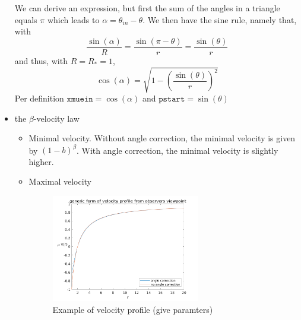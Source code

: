 \documentclass[../main/main.tex]{subfiles}
\begin{document}
\begin{itemize}
\begin{center}
\end{center}
We can derive an expression, but first the sum of the angles in a triangle equals $\pi$ which leads to $\alpha = \theta_{in} - \theta$. We then have the sine rule, namely that, with
\begin{equation}
\frac{\sin(\alpha)}{R} = \frac{\sin(\pi-\theta)}{r} = \frac{\sin(\theta)}{r}
\end{equation}
and thus, with $R=R_{*} = 1$,
\begin{equation}
\cos(\alpha) = \sqrt{1 - \left( \frac{\sin(\theta)}{r} \right)^2}
\end{equation}
Per definition $\texttt{xmuein} = \cos(\alpha)$ and $\texttt{pstart} = \sin(\theta)$

\item the $\beta$-velocity law
\begin{itemize}
\item Minimal velocity. Without angle correction, the minimal velocity is given by $(1-b)^{\beta}$. With angle correction, the minimal velocity is slightly higher.

\item Maximal velocity

\begin{figure}[!htp]
\centering
\includegraphics[width=0.65\textwidth]{../../two_resonance_lines/figures/velocity_profile.png}
\caption{Example of velocity profile (give paramters)}
\label{example_velocity_profile}
\end{figure}


\end{itemize}
\end{itemize}
\end{document}
